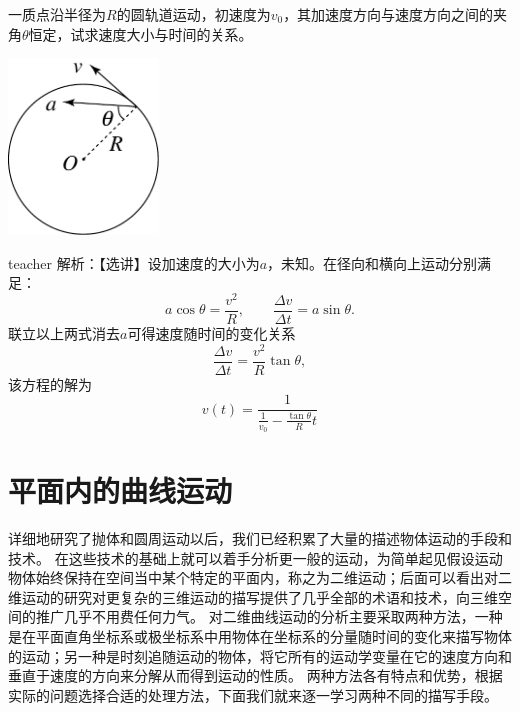 \begin{example}
一质点沿半径为$R$的圆轨道运动，初速度为$v_0$，其加速度方向与速度方向之间的夹角$ \theta$恒定，试求速度大小与时间的关系。
\begin{flushright}
\includegraphics[width=0.3\textwidth]{images/motion-problem-41.pdf}
\end{flushright}
\begin{taggedblock}{teacher}
\noindent
解析：【选讲】设加速度的大小为$a$，未知。在径向和横向上运动分别满足：
\[
a\cos\theta = \frac{v^2}{R},\qquad \frac{\Delta v}{\Delta t} = a\sin\theta.
\]
联立以上两式消去$a$可得速度随时间的变化关系
\[
\frac{\Delta v}{\Delta t} = \frac{v^2}{R}\tan\theta,
\]
该方程的解为
\[
v(t) = \frac{1}{\frac{1}{v_0}-\frac{\tan\theta}{R}t}
\]
\end{taggedblock}
\end{example}











\section{平面内的曲线运动}
详细地研究了抛体和圆周运动以后，我们已经积累了大量的描述物体运动的手段和技术。
在这些技术的基础上就可以着手分析更一般的运动，为简单起见假设运动物体始终保持在空间当中某个特定的平面内，称之为二维运动；后面可以看出对二维运动的研究对更复杂的三维运动的描写提供了几乎全部的术语和技术，向三维空间的推广几乎不用费任何力气。
对二维曲线运动的分析主要采取两种方法，一种是在平面直角坐标系或极坐标系中用物体在坐标系的分量随时间的变化来描写物体的运动；另一种是时刻追随运动的物体，将它所有的运动学变量在它的速度方向和垂直于速度的方向来分解从而得到运动的性质。
两种方法各有特点和优势，根据实际的问题选择合适的处理方法，下面我们就来逐一学习两种不同的描写手段。

